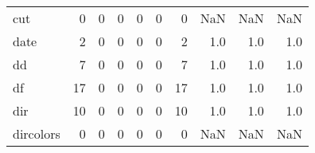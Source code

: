 \begin{tabular}{lrrrrrrrrr}
cut       &                                                  0 &                                                  0 &                                                  0 &                                                  0 &                                                  0 &                                                  0 &                                                NaN &                                    NaN &                                  NaN \\
date      &                                                  2 &                                                  0 &                                                  0 &                                                  0 &                                                  0 &                                                  2 &                                                1.0 &                                    1.0 &                                  1.0 \\
dd        &                                                  7 &                                                  0 &                                                  0 &                                                  0 &                                                  0 &                                                  7 &                                                1.0 &                                    1.0 &                                  1.0 \\
df        &                                                 17 &                                                  0 &                                                  0 &                                                  0 &                                                  0 &                                                 17 &                                                1.0 &                                    1.0 &                                  1.0 \\
dir       &                                                 10 &                                                  0 &                                                  0 &                                                  0 &                                                  0 &                                                 10 &                                                1.0 &                                    1.0 &                                  1.0 \\
dircolors &                                                  0 &                                                  0 &                                                  0 &                                                  0 &                                                  0 &                                                  0 &                                                NaN &                                    NaN &                                  NaN \\

\end{tabular}
